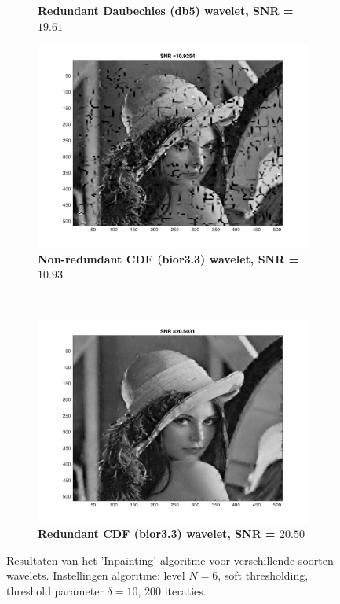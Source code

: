 \begin{figure}
\begin{subfigure}[b]{0.45\textwidth}
        \caption{\textbf{ Redundant Daubechies (db5) wavelet, SNR = $\mathbf{19.61}$} }
        \label{fig:matti_fig_rwt_db5}
    \end{subfigure}
        \begin{subfigure}[b]{0.45\textwidth}
        \includegraphics[width=\textwidth]{../src/inpainting/vraag_2_3_wt_bior33}
        \caption{\textbf{ Non-redundant CDF (bior3.3) wavelet, SNR = $\mathbf{10.93}$} }
        \label{fig:matti_fig_wt_bior33}
    \end{subfigure}
    ~ %
    \begin{subfigure}[b]{0.45\textwidth}
        \includegraphics[width=\textwidth]{../src/inpainting/vraag_2_3_rwt_bior33}
        \caption{\textbf{ Redundant CDF (bior3.3) wavelet, SNR = $\mathbf{20.50}$} }
        \label{fig:matti_fig_rwt_bior33}
    \end{subfigure}
    \caption{Resultaten van het 'Inpainting' algoritme voor verschillende soorten wavelets. Instellingen algoritme: level $N = 6$, soft thresholding, threshold parameter $\delta = 10$, 200 iteraties.}\label{fig:matti_fig_rwt}
\end{figure}



